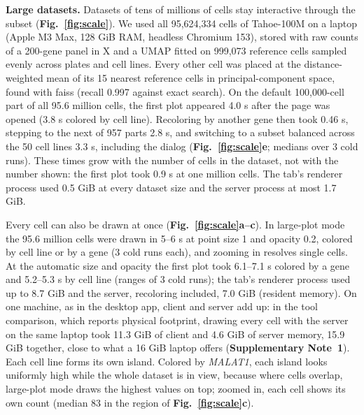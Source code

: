 \textbf{Large datasets.} Datasets of tens of millions of cells stay interactive through the subset (\textbf{Fig.~\ref{fig:scale}}). We used all 95,624,334 cells of Tahoe-100M\cite{zhang2025tahoe} on a laptop (Apple M3 Max, 128 GiB RAM, headless Chromium 153), stored with raw counts of a 200-gene panel in X and a UMAP\cite{mcinnes2018umap} fitted on 999,073 reference cells sampled evenly across plates and cell lines. Every other cell was placed at the distance-weighted mean of its 15 nearest reference cells in principal-component space, found with faiss\cite{johnson2021faiss} (recall 0.997 against exact search). On the default 100,000-cell part of all 95.6 million cells, the first plot appeared 4.0 s after the page was opened (3.8 s colored by cell line). Recoloring by another gene then took 0.46 s, stepping to the next of 957 parts 2.8 s, and switching to a subset balanced across the 50 cell lines 3.3 s, including the dialog (\textbf{Fig.~\ref{fig:scale}e}; medians over 3 cold runs). These times grow with the number of cells in the dataset, not with the number shown: the first plot took 0.9 s at one million cells. The tab's renderer process used 0.5 GiB at every dataset size and the server process at most 1.7 GiB.

Every cell can also be drawn at once (\textbf{Fig.~\ref{fig:scale}a--c}). In large-plot mode the 95.6 million cells were drawn in 5--6 s at point size 1 and opacity 0.2, colored by cell line or by a gene (3 cold runs each), and zooming in resolves single cells. At the automatic size and opacity the first plot took 6.1--7.1 s colored by a gene and 5.2--5.3 s by cell line (ranges of 3 cold runs); the tab's renderer process used up to 8.7 GiB and the server, recoloring included, 7.0 GiB (resident memory). On one machine, as in the desktop app, client and server add up: in the tool comparison, which reports physical footprint, drawing every cell with the server on the same laptop took 11.3 GiB of client and 4.6 GiB of server memory, 15.9 GiB together, close to what a 16 GiB laptop offers (\textbf{Supplementary Note~1}). Each cell line forms its own island. Colored by \textit{MALAT1}, each island looks uniformly high while the whole dataset is in view, because where cells overlap, large-plot mode draws the highest values on top; zoomed in, each cell shows its own count (median 83 in the region of \textbf{Fig.~\ref{fig:scale}c}).

